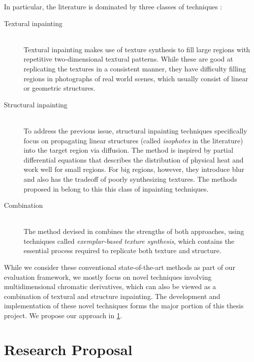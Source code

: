 \documentclass[11pt,oneside]{book}
\theoremstyle{plain}
\theoremstyle{definition}
\theoremstyle{remark}
\begin{document}
In particular, the literature is dominated by three classes of techniques \cite{Criminisi2004}:
\begin{description}
\item[Textural inpainting] \hfill \\
  Textural inpainting makes use of texture synthesis to fill 
  large regions with repetitive two-dimensional textural patterns.
  While these are good at replicating the textures in a consistent manner, 
  they have difficulty filling regions in photographs of real world scenes,
  which usually consist of linear or geometric structures.
\item[Structural inpainting] \hfill \\
  To address the previous issue, structural inpainting techniques specifically
  focus on propagating linear structures (called \emph{isophotes} in the literature)
  into the target region via diffusion. The method is inspired by partial differential
  equations that describes the distribution of physical heat and work well for small regions.
  For big regions, however, they introduce blur and also has the tradeoff of poorly 
  synthesizing textures. The methods proposed in \cite{Bertalmio2000,Bertalmio2001}
  belong to this this class of inpainting techniques.
\item[Combination] \hfill \\
  The method devised in \cite{Criminisi2004} combines the strengths of both approaches,
  using techniques called \emph{exemplar-based texture synthesis},
  which contains the essential process required to replicate both texture and structure.
\end{description} 

While we consider these conventional state-of-the-art methods as part of our evaluation
framework, we mostly focus on novel techniques involving multidimensional
chromatic derivatives, which can also be viewed as a combination of textural and structure
inpainting. The development and implementation of these novel techniques forms the major
portion of this thesis project. We propose our approach in \cref{proposal}. 

\newpage


\chapter{Research Proposal} \label{proposal}
\end{document}

